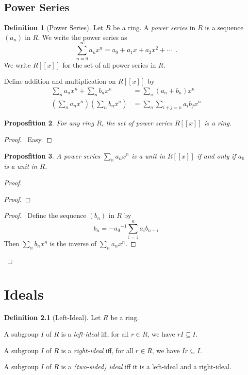 \documentclass{book}
\let\qed\relax
\newtheorem{prop}{Proposfition}[chapter]
\theoremstyle{definition}
\newtheorem{df}[prop]{Definition}
\newcommand{\inv}[1]{\ensuremath{{#1}^{-1}}}
\begin{document}
\section{Power Series}

\begin{df}[Power Series]
Let $R$ be a ring. A \emph{power series} in $R$ is a sequence $(a_n)$ in $R$. We write the power series as
\[ \sum_{n=0}^{\infty} a_n x^n = a_0 + a_1 x + a_2 x^2 + \cdots \enspace . \]
We write $R[[x]]$ for the set of all power series in $R$.

Define addition and multiplication on $R[[x]]$ by
\begin{align*}
\sum_n a_n x^n + \sum_n b_n x^n & = \sum_n (a_n + b_n) x^n \\
\left( \sum_n a_n x^n \right) \left( \sum_n b_n x^n \right) & = \sum_n \sum_{i+j=n} a_i b_j x^n
\end{align*}
\end{df}

\begin{prop}
For any ring $R$, the set of power series $R[[x]]$ is a ring.
\end{prop}

\begin{proof}
\pf\ Easy. \qed
\end{proof}

\begin{prop}
A power series $\sum_n a_n x^n$ is a unit in $R[[x]]$ if and only if $a_0$ is a unit in $R$.
\end{prop}

\begin{proof}
\pf
{}
\begin{proof}
\end{proof}
\begin{proof}
	\pf\ Define the sequence $(b_n)$ in $R$ by
	\[ b_n = - \inv{a_0} \sum_{i=1}^n a_i b_{n-i} \]
	Then $\sum_n b_n x^n$ is the inverse of $\sum_n a_n x^n$.
\end{proof}
\qed
\end{proof}

\chapter{Ideals}

\begin{df}[Left-Ideal]
Let $R$ be a ring.

A subgroup $I$ of $R$ is a \emph{left-ideal} iff, for all $r \in R$, we have $rI \subseteq I$.

A subgroup $I$ of $R$ is a \emph{right-ideal} iff, for all $r \in R$, we have $Ir \subseteq I$.

A subgroup $I$ of $R$ is a \emph{(two-sided) ideal} iff it is a left-ideal and a right-ideal.
\end{df}
\end{document}
